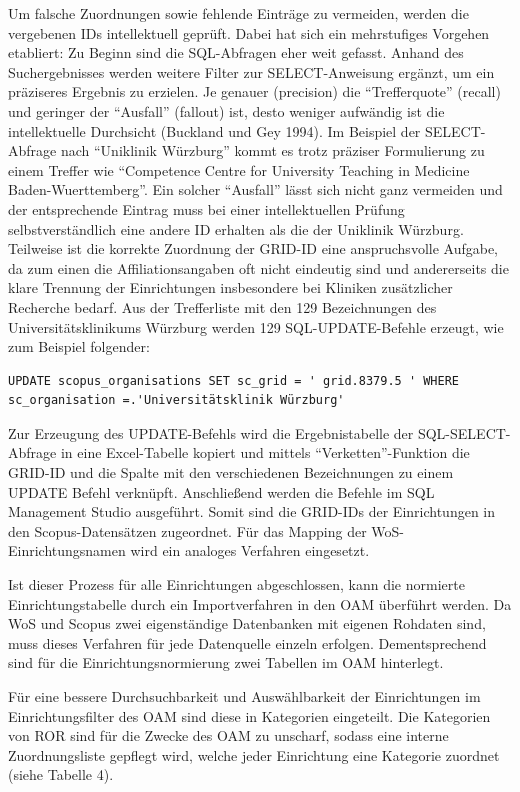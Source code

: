 \documentclass[a4paper,
fontsize=11pt,
oneside,
numbers=noperiodatend,
parskip=half-,
bibliography=totoc,
final
]{scrartcl}
\begin{document}
Um falsche Zuordnungen sowie fehlende Einträge zu vermeiden, werden die
vergebenen IDs intellektuell geprüft. Dabei hat sich ein mehrstufiges
Vorgehen etabliert: Zu Beginn sind die SQL-Abfragen eher weit gefasst.
Anhand des Suchergebnisses werden weitere Filter zur SELECT-Anweisung
ergänzt, um ein präziseres Ergebnis zu erzielen. Je genauer (precision)
die \enquote{Trefferquote} (recall) und geringer der \enquote{Ausfall}
(fallout) ist, desto weniger aufwändig ist die intellektuelle Durchsicht
(Buckland und Gey 1994). Im Beispiel der SELECT-Abfrage nach
\enquote{Uniklinik Würzburg} kommt es trotz präziser Formulierung zu
einem Treffer wie \enquote{Competence Centre for University Teaching in
Medicine Baden-Wuerttemberg}. Ein solcher \enquote{Ausfall} lässt sich
nicht ganz vermeiden und der entsprechende Eintrag muss bei einer
intellektuellen Prüfung selbstverständlich eine andere ID erhalten als
die der Uniklinik Würzburg. Teilweise ist die korrekte Zuordnung der
GRID-ID eine anspruchsvolle Aufgabe, da zum einen die
Affiliationsangaben oft nicht eindeutig sind und andererseits die klare
Trennung der Einrichtungen insbesondere bei Kliniken zusätzlicher
Recherche bedarf. Aus der Trefferliste mit den 129 Bezeichnungen des
Universitätsklinikums Würzburg werden 129 SQL-UPDATE-Befehle erzeugt,
wie zum Beispiel folgender:

\begin{verbatim}
UPDATE scopus_organisations SET sc_grid = ' grid.8379.5 ' WHERE
sc_organisation =.'Universitätsklinik Würzburg'
\end{verbatim}

Zur Erzeugung des UPDATE-Befehls wird die Ergebnistabelle der
SQL-SELECT-Abfrage in eine Excel-Tabelle kopiert und mittels
\enquote{Verketten}-Funktion die GRID-ID und die Spalte mit den
verschiedenen Bezeichnungen zu einem UPDATE Befehl verknüpft.
Anschließend werden die Befehle im SQL Management Studio ausgeführt.
Somit sind die GRID-IDs der Einrichtungen in den Scopus-Datensätzen
zugeordnet. Für das Mapping der WoS-Einrichtungsnamen wird ein analoges
Verfahren eingesetzt.

Ist dieser Prozess für alle Einrichtungen abgeschlossen, kann die
normierte Einrichtungstabelle durch ein Importverfahren in den OAM
überführt werden. Da WoS und Scopus zwei eigenständige Datenbanken mit
eigenen Rohdaten sind, muss dieses Verfahren für jede Datenquelle
einzeln erfolgen. Dementsprechend sind für die Einrichtungsnormierung
zwei Tabellen im OAM hinterlegt.

Für eine bessere Durchsuchbarkeit und Auswählbarkeit der Einrichtungen
im Einrichtungsfilter des OAM sind diese in Kategorien eingeteilt. Die
Kategorien von ROR sind für die Zwecke des OAM zu unscharf, sodass eine
interne Zuordnungsliste gepflegt wird, welche jeder Einrichtung eine
Kategorie zuordnet (siehe Tabelle 4).
\end{document}

